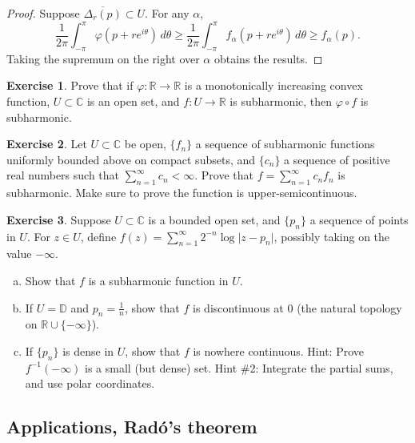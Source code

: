 \documentclass[12pt,openany]{book}
\newcommand{\sabs}[1]{\lvert {#1} \rvert}
\newcommand{\C}{{\mathbb{C}}}
\newcommand{\R}{{\mathbb{R}}}
\newcommand{\D}{{\mathbb{D}}}
\theoremstyle{plain}
\theoremstyle{remark}
\theoremstyle{definition}
\newenvironment{exbox}{%
    \def\FrameCommand{\vrule width 1pt \relax\hspace {10pt}}%
    \MakeFramed {\advance \hsize -\width \FrameRestore }%
}{%
    \endMakeFramed
}
\newenvironment{exparts}{%
    \leavevmode\begin{enumerate}[a),noitemsep,topsep=0pt,parsep=0pt,partopsep=0pt]
}{%
    \end{enumerate}
}
\theoremstyle{exercise}
\newtheorem{exercise}{Exercise}[section]
\theoremstyle{example}
\begin{document}
\begin{proof}
Suppose $\overline{\Delta_r(p)} \subset U$.  For any $\alpha$,
\begin{equation*}
\frac{1}{2\pi} \int_{-\pi}^{\pi} \varphi (p+re^{i\theta})\, d\theta 
\geq
\frac{1}{2\pi} \int_{-\pi}^{\pi} f_\alpha (p+re^{i\theta})\, d\theta 
\geq f_\alpha(p) .
\end{equation*}
Taking the supremum on the right over $\alpha$ obtains the results.
\end{proof}

\begin{exbox}
\begin{exercise}
Prove that if $\varphi \colon \R \to \R$ is a monotonically increasing
convex function, $U \subset \C$ is an open set, and $f \colon U \to \R$
is subharmonic, then $\varphi \circ f$ is subharmonic.
\end{exercise}

\begin{exercise}
Let $U \subset \C$ be open, $\{ f_n \}$ a sequence of 
subharmonic functions uniformly bounded above on compact subsets, and 
$\{ c_n \}$ a sequence of positive real numbers such that
$\sum_{n=1}^\infty c_n < \infty$.
Prove that $f = \sum_{n=1}^\infty c_n f_n$ is subharmonic.  Make sure to prove
the function is upper-semicontinuous.
\end{exercise}

\begin{exercise}
Suppose $U \subset \C$ is a bounded open set, and $\{ p_n \}$ a sequence of points in
$U$. For $z \in U$, define
$f(z) = \sum_{n=1}^\infty 2^{-n} \log \sabs{z-p_n}$, possibly taking on the
value $-\infty$.
\begin{exparts}
\item
Show that $f$ is a subharmonic function in $U$.
\item
If $U = \D$ and $p_n = \frac{1}{n}$, show that $f$ is discontinuous at $0$
(the natural topology on $\R \cup \{ -\infty \}$).
\item
If $\{ p_n \}$ is dense in $U$, show that $f$ 
is nowhere continuous.
Hint: Prove $f^{-1}(-\infty)$ is a small (but dense) set.
Hint \#2: Integrate the partial sums, and use polar coordinates.
\end{exparts}
\end{exercise}
\end{exbox}

\subsection{Applications, Rad\'o's theorem}
\end{document}
